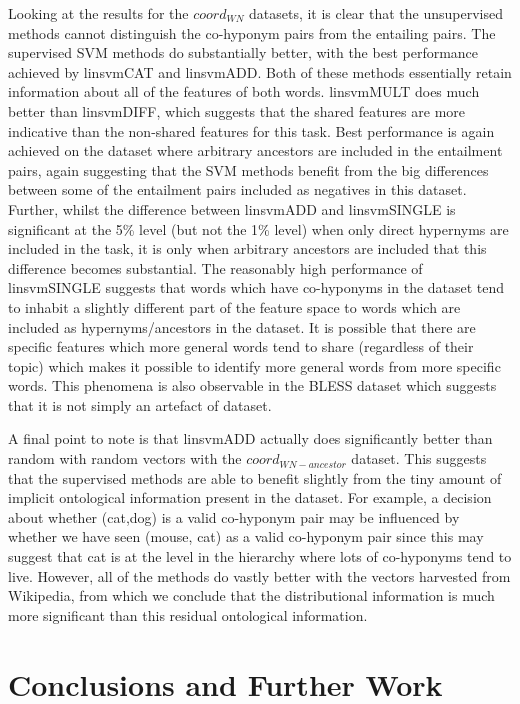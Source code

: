 \documentclass[11pt]{article}
\begin{document}
Looking at the results for the $coord_{WN}$ datasets, it is clear that the unsupervised methods cannot distinguish the co-hyponym pairs from the entailing pairs.  The supervised SVM methods do substantially better, with the best performance achieved by linsvmCAT and linsvmADD.  Both of these methods essentially retain information about all of the features of both words.  linsvmMULT does much better than linsvmDIFF, which suggests that the shared features are more indicative than the non-shared features for this task.  Best performance is again achieved on the dataset where arbitrary ancestors are included in the entailment pairs, again suggesting that the SVM methods benefit from the big differences between some of the entailment pairs included as negatives in this dataset.  Further, whilst the difference between linsvmADD and linsvmSINGLE is significant at the 5\% level (but not the 1\% level) when only direct hypernyms are included in the task, it is only when arbitrary ancestors are included that this difference becomes substantial.   The reasonably high performance of linsvmSINGLE suggests that words which have co-hyponyms in the dataset tend to inhabit a slightly different part of the feature space to words which are included as hypernyms/ancestors in the dataset.  It is possible that there are specific features which more general words tend to share (regardless of their topic) which makes it possible to identify more general words from more specific words.  This phenomena is also observable in the BLESS dataset which suggests that it is not simply an artefact of dataset.

A final point to note is that linsvmADD actually does significantly better than random with random vectors with the $coord_{WN-ancestor}$ dataset.  This suggests that the supervised methods are able to benefit slightly from the tiny amount of implicit ontological information present in the dataset.  For example, a decision about whether (cat,dog) is a valid co-hyponym pair may be influenced by whether we have seen (mouse, cat) as a valid co-hyponym pair since this may suggest that cat is at the level in the hierarchy where lots of co-hyponyms tend to live.  However, all of the methods do vastly better with the vectors harvested from Wikipedia, from which we conclude that the distributional information is much more significant than this residual ontological information.

\section{Conclusions and Further Work}
\end{document}
